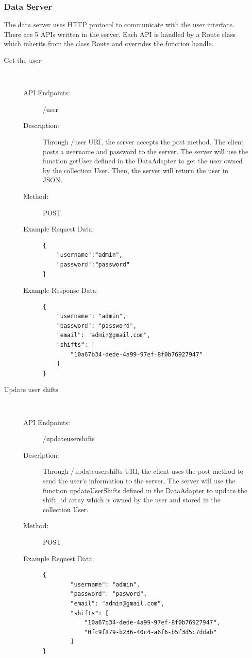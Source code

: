 \documentclass[11pt, oneside]{article}   	%
\begin{document}
\subsubsection{Data Server}
The data server uses HTTP protocol to communicate with the user interface. 
There are 5 APIs written in the server. 
Each API is handled by a Route class which inherits from the class Route and overrides the function handle.

\begin{description}
\item[Get the user]
\
\begin{description}
\item[API Endpoints:] /user
\item[Description:] Through /user URI, the server accepts the post method. The client posts a username and password to the server. 
The server will use the function getUser defined in the DataAdapter to get the user owned by the collection User. Then, the server will return the user in JSON.
\item[Method:] POST
\item[Example Request Data:]
\begin{verbatim}
{
    "username":"admin",
    "password":"password"
}
\end{verbatim}
\item[Example Response Data:]
\begin{verbatim}
{
    "username": "admin",
    "password": "password",
    "email": "admin@gmail.com",
    "shifts": [
        "10a67b34-dede-4a99-97ef-8f0b76927947"
    ]
}
\end{verbatim}
\end{description}





\item[Update user shifts]
\
\begin{description}
\item[API Endpoints:] /updateusershifts
\item[Description:] Through /updateusershifts URI, the client uses the post method to send the user’s information to the server.
The server will use the function updateUserShifts defined in the DataAdapter to update the shift\_id array which is owned by the user and stored in the collection User.
\item[Method:] POST
\item[Example Request Data:]
\begin{verbatim}
{
        "username": "admin",
        "password": "pasword",
        "email": "admin@gmail.com",
        "shifts": [
            "10a67b34-dede-4a99-97ef-8f0b76927947",
            "0fc9f879-b236-40c4-a6f6-b5f3d5c7ddab"
        ]
}


\end{verbatim}
\end{description}
\end{description}
\end{document}
